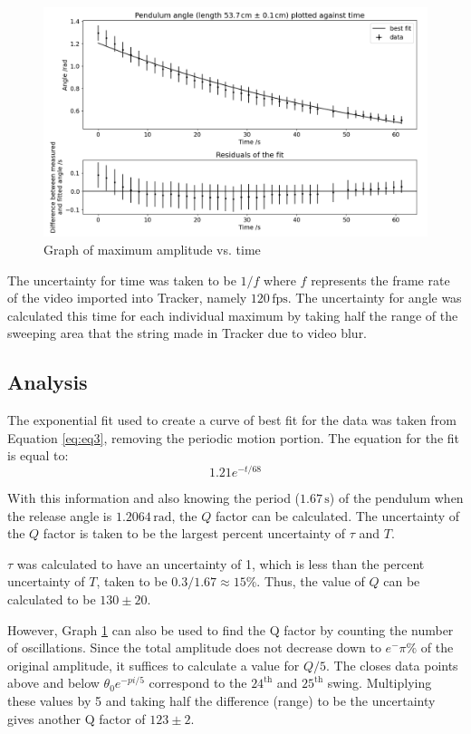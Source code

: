 \documentclass[12pt]{article}
\begin{document}
\begin{figure}[!hptb]
    \centering
    \includegraphics[width=\textwidth]{../figures/max_amplitude_vs_time.png}
    \caption{\centering Graph of maximum amplitude vs. time}
    \label{fig:figure 4}
\end{figure}

The uncertainty for time was taken to be $1/f$ where $f$ represents the frame rate of the video imported into Tracker, namely $120\,\text{fps}$. The uncertainty for angle was calculated this time for each individual maximum by taking half the range of the sweeping area that the string made in Tracker due to video blur.

\subsection{Analysis}
The exponential fit used to create a curve of best fit for the data was taken from Equation \ref{eq:eq3}, removing the periodic motion portion. The equation for the fit is equal to:
\begin{equation}
    1.21e^{-{t}/68}
\end{equation}

With this information and also knowing the period ($1.67\,\text{s}$) of the pendulum when the release angle is $1.2064\,\text{rad}$, the $Q$ factor can be calculated. The uncertainty of the $Q$ factor is taken to be the largest percent uncertainty of $\tau$ and $T$.

$\tau$ was calculated to have an uncertainty of 1, which is less than the percent uncertainty of $T$, taken to be $0.3/1.67 \approx 15\%$. Thus, the value of $Q$ can be calculated to be $130 \pm 20$.

However, Graph \ref{fig:figure 4} can also be used to find the Q factor by counting the number of oscillations. Since the total amplitude does not decrease down to $e^-\pi \%$ of the original amplitude, it suffices to calculate a value for $Q/5$. The closes data points above and below $\theta_0e^{-{pi/5}}$ correspond to the $24^\text{th}$ and $25^\text{th}$ swing. Multiplying these values by 5 and taking half the difference (range) to be the uncertainty gives another Q factor of $123 \pm 2$.

\newpage

\printbibliography
\end{document}
